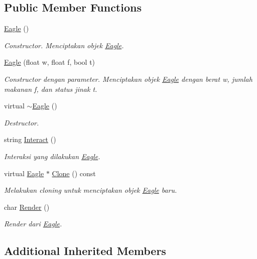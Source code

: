 \subsection*{Public Member Functions}
\begin{DoxyCompactItemize}
\item 
\hyperlink{classEagle_a8b205e5b26bece07d18b852b042851fe}{Eagle} ()
\begin{DoxyCompactList}\small\item\em Constructor. Menciptakan objek \hyperlink{classEagle}{Eagle}. \end{DoxyCompactList}\item 
\hyperlink{classEagle_ae59cc80952be37499b10e270714af1d8}{Eagle} (float w, float f, bool t)
\begin{DoxyCompactList}\small\item\em Constructor dengan parameter. Menciptakan objek \hyperlink{classEagle}{Eagle} dengan berat w, jumlah makanan f, dan status jinak t. \end{DoxyCompactList}\item 
virtual \hyperlink{classEagle_a530318b3eb744ad26c9060d61aa314fe}{$\sim$\+Eagle} ()
\begin{DoxyCompactList}\small\item\em Destructor. \end{DoxyCompactList}\item 
string \hyperlink{classEagle_a64abae4f80bcdcba7dac9f03126f42aa}{Interact} ()
\begin{DoxyCompactList}\small\item\em Interaksi yang dilakukan \hyperlink{classEagle}{Eagle}. \end{DoxyCompactList}\item 
virtual \hyperlink{classEagle}{Eagle} $\ast$ \hyperlink{classEagle_ace8cb419354688615938d2a53d5c1566}{Clone} () const 
\begin{DoxyCompactList}\small\item\em Melakukan cloning untuk menciptakan objek \hyperlink{classEagle}{Eagle} baru. \end{DoxyCompactList}\item 
char \hyperlink{classEagle_a34e512cb19b5ba1f8a7bce937c57f33f}{Render} ()
\begin{DoxyCompactList}\small\item\em Render dari \hyperlink{classEagle}{Eagle}. \end{DoxyCompactList}\end{DoxyCompactItemize}
\subsection*{Additional Inherited Members}


